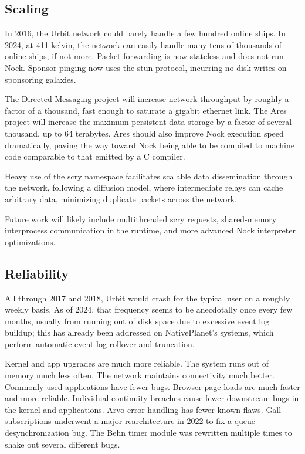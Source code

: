 \documentclass[twoside]{article}
\begin{document}
\subsection{Scaling}

In 2016, the Urbit network could barely handle a few hundred online ships.  In 2024, at 411 kelvin, the network can easily handle many tens of thousands of online ships, if not more.  Packet forwarding is now stateless and does not run Nock.  Sponsor pinging now uses the {\sc stun} protocol, incurring no disk writes on sponsoring galaxies.

The Directed Messaging project will increase network throughput by roughly a factor of a thousand, fast enough to saturate a gigabit ethernet link.  The Ares project will increase the maximum persistent data storage by a factor of several thousand, up to 64 terabytes.  Ares should also improve Nock execution speed dramatically, paving the way toward Nock being able to be compiled to machine code comparable to that emitted by a C compiler.

Heavy use of the scry namespace facilitates scalable data dissemination through the network, following a diffusion model, where intermediate relays can cache arbitrary data, minimizing duplicate packets across the network.

Future work will likely include multithreaded scry requests, shared-memory interprocess communication in the runtime, and more advanced Nock interpreter optimizations.

\subsection{Reliability}

All through 2017 and 2018, Urbit would crash for the typical user on a roughly weekly basis.  As of 2024, that frequency seems to be anecdotally once every few months, usually from running out of disk space due to excessive event log buildup; this has already been addressed on NativePlanet's systems, which perform automatic event log rollover and truncation.

Kernel and app upgrades are much more reliable.  The system runs out of memory much less often.  The network maintains connectivity much better.  Commonly used applications have fewer bugs.  Browser page loads are much faster and more reliable.  Individual continuity breaches cause fewer downstream bugs in the kernel and applications.  Arvo error handling has fewer known flaws.  Gall subscriptions underwent a major rearchitecture in 2022 to fix a queue desynchronization bug.  The Behn timer module was rewritten multiple times to shake out several different bugs.
\end{document}
